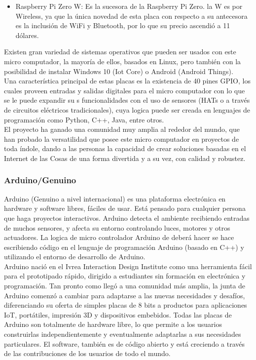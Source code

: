 \begin{itemize}
\item Raspberry Pi Zero W: Es la sucesora de la Raspberry Pi Zero. la W es por Wireless, ya que la única novedad de esta placa con respecto a su antecesora es la inclusión de WiFi y Bluetooth, por lo que su precio ascendió a 11 dólares.
\end{itemize}
Existen gran variedad de sistemas operativos que pueden ser usados con este micro computador, la mayoría de ellos, basados en Linux, pero también con la posibilidad de instalar Windows 10 (Iot Core) o Android (Android Things).\\

Una característica principal de estas placas es la existencia de 40 pines GPIO, los cuales proveen entradas y salidas digitales para el micro computador con lo que se le puede expandir su s funcionalidades con el uso de sensores (HATs o a través de circuitos eléctricos tradicionales), cuya logica puede ser creada en lenguajes de programación como Python, C++, Java, entre otros.\\

El proyecto ha ganado una comunidad muy amplia al rededor del mundo, que han probado la versatilidad que posee este micro computador en proyectos de toda índole, dando a las personas la capacidad de crear soluciones basadas en el Internet de las Cosas de una forma divertida y a su vez, con calidad y robustez.

\subsubsection{Arduino/Genuino}
Arduino (Genuino a nivel internacional) es una plataforma electrónica en hardware y software libres, fáciles de usar. Está pensado para cualquier persona que haga proyectos interactivos.\cite{ArduinoOfficial} Arduino detecta el ambiente recibiendo entradas de muchos sensores, y afecta su entorno controlando luces, motores y otros actuadores. La logica de micro controlador Arduino de deberá hacer se hace escribiendo código en el lenguaje de programación Arduino (basado en C++) y utilizando el entorno de desarrollo de Arduino.\\

Arduino nació en el Ivrea Interaction Design Institute como una herramienta fácil para el prototipado rápido, dirigido a estudiantes sin formación en electrónica y programación. Tan pronto como llegó a una comunidad más amplia, la junta de Arduino comenzó a cambiar para adaptarse a las nuevas necesidades y desafíos, diferenciando su oferta de simples placas de 8 bits a productos para aplicaciones IoT, portátiles, impresión 3D y dispositivos embebidos. Todas las placas de Arduino son totalmente de hardware libre, lo que permite a los usuarios construirlas independientemente y eventualmente adaptarlas a sus necesidades particulares. El software, también es de código abierto y está creciendo a través de las contribuciones de los usuarios de todo el mundo.\\

